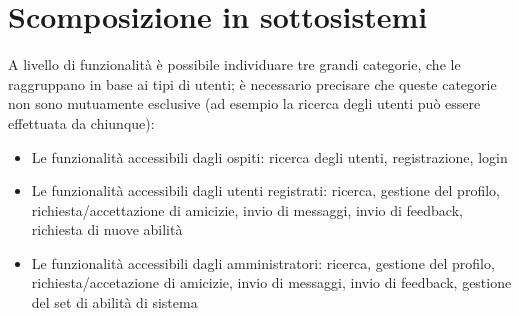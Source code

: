 \section{Scomposizione in sottosistemi}
\justifying
A livello di funzionalità è possibile individuare tre grandi categorie, che le raggruppano in base ai tipi di utenti; è necessario precisare che queste categorie non sono mutuamente
esclusive (ad esempio la ricerca degli utenti può essere effettuata da chiunque):
\begin{itemize}
 \item Le funzionalità accessibili dagli ospiti: ricerca degli utenti, registrazione, login
 \item Le funzionalità accessibili dagli utenti registrati: ricerca, gestione del profilo, richiesta/accettazione di amicizie, invio di messaggi, invio di feedback, richiesta di
 nuove abilità
 \item Le funzionalità accessibili dagli amministratori: ricerca, gestione del profilo, richiesta/accetazione di amicizie, invio di messaggi, invio di feedback, gestione del set di
 abilità di sistema
\end{itemize}

